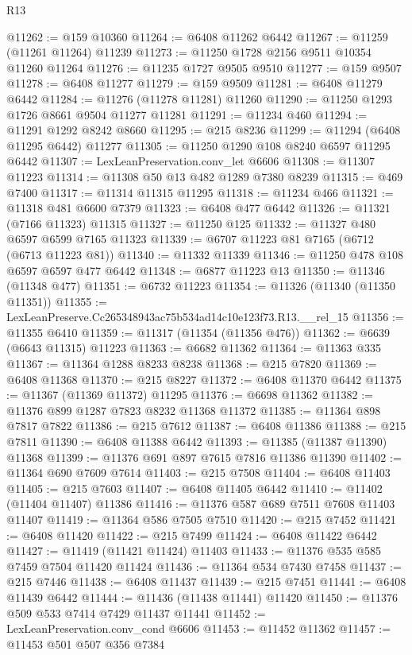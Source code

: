 \begin{lexlean}{R13}
\begin{coremodule}
@11262 := @159 @10360
@11264 := @6408 @11262 @6442
@11267 := @11259 (@11261 @11264) @11239
@11273 := @11250 @1728 @2156 @9511 @10354 @11260 @11264
@11276 := @11235 @1727 @9505 @9510
@11277 := @159 @9507
@11278 := @6408 @11277
@11279 := @159 @9509
@11281 := @6408 @11279 @6442
@11284 := @11276 (@11278 @11281) @11260
@11290 := @11250 @1293 @1726 @8661 @9504 @11277 @11281
@11291 := @11234 @460
@11294 := @11291 @1292 @8242 @8660
@11295 := @215 @8236
@11299 := @11294 (@6408 @11295 @6442) @11277
@11305 := @11250 @1290 @108 @8240 @6597 @11295 @6442
@11307 := LexLeanPreservation.conv_let @6606
@11308 := @11307 @11223
@11314 := @11308 @50 @13 @482 @1289 @7380 @8239
@11315 := @469 @7400
@11317 := @11314 @11315 @11295
@11318 := @11234 @466
@11321 := @11318 @481 @6600 @7379
@11323 := @6408 @477 @6442
@11326 := @11321 (@7166 @11323) @11315
@11327 := @11250 @125
@11332 := @11327 @480 @6597 @6599 @7165 @11323
@11339 := @6707 @11223 @81 @7165 (@6712 (@6713 @11223 @81))
@11340 := @11332 @11339
@11346 := @11250 @478 @108 @6597 @6597 @477 @6442
@11348 := @6877 @11223 @13
@11350 := @11346 (@11348 @477)
@11351 := @6732 @11223
@11354 := @11326 (@11340 (@11350 @11351))
@11355 := LexLeanPreserve.Cc265348943ac75b534ad14c10e123f73.R13.__rel_15
@11356 := @11355 @6410
@11359 := @11317 (@11354 (@11356 @476))
@11362 := @6639 (@6643 @11315) @11223
@11363 := @6682 @11362
@11364 := @11363 @335
@11367 := @11364 @1288 @8233 @8238
@11368 := @215 @7820
@11369 := @6408 @11368
@11370 := @215 @8227
@11372 := @6408 @11370 @6442
@11375 := @11367 (@11369 @11372) @11295
@11376 := @6698 @11362
@11382 := @11376 @899 @1287 @7823 @8232 @11368 @11372
@11385 := @11364 @898 @7817 @7822
@11386 := @215 @7612
@11387 := @6408 @11386
@11388 := @215 @7811
@11390 := @6408 @11388 @6442
@11393 := @11385 (@11387 @11390) @11368
@11399 := @11376 @691 @897 @7615 @7816 @11386 @11390
@11402 := @11364 @690 @7609 @7614
@11403 := @215 @7508
@11404 := @6408 @11403
@11405 := @215 @7603
@11407 := @6408 @11405 @6442
@11410 := @11402 (@11404 @11407) @11386
@11416 := @11376 @587 @689 @7511 @7608 @11403 @11407
@11419 := @11364 @586 @7505 @7510
@11420 := @215 @7452
@11421 := @6408 @11420
@11422 := @215 @7499
@11424 := @6408 @11422 @6442
@11427 := @11419 (@11421 @11424) @11403
@11433 := @11376 @535 @585 @7459 @7504 @11420 @11424
@11436 := @11364 @534 @7430 @7458
@11437 := @215 @7446
@11438 := @6408 @11437
@11439 := @215 @7451
@11441 := @6408 @11439 @6442
@11444 := @11436 (@11438 @11441) @11420
@11450 := @11376 @509 @533 @7414 @7429 @11437 @11441
@11452 := LexLeanPreservation.conv_cond @6606
@11453 := @11452 @11362
@11457 := @11453 @501 @507 @356 @7384

\end{coremodule}
\end{lexlean}
